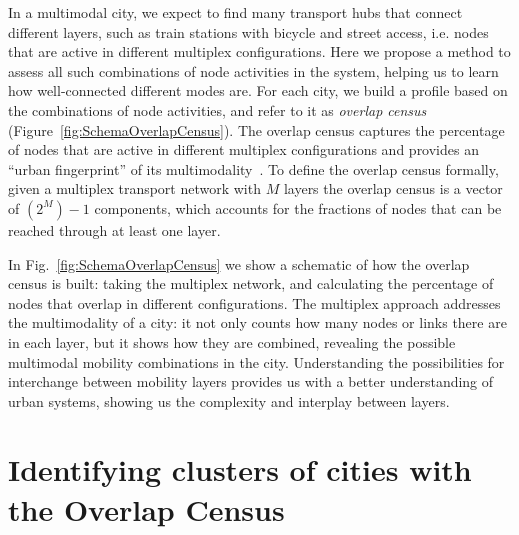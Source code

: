 In a multimodal city, we expect to find many transport hubs that connect different layers, such as train stations with bicycle and street access, i.e. nodes that are active in different multiplex configurations. Here we propose a method to assess all such combinations of node activities in the system, helping us to learn how well-connected different modes are. For each city, we build a profile based on the combinations of node activities, and refer to it as \emph{overlap census} (Figure~\ref{fig:SchemaOverlapCensus}). The overlap census captures the percentage of nodes that are active in different multiplex configurations and provides an ``urban fingerprint'' of its multimodality~\cite{Aleta2017Multilayer}. To define the overlap census formally, given a multiplex transport network with $M$ layers the overlap census is a vector of $(2^M)-1$ components, which accounts for the fractions of nodes that can be reached through at least one layer.

In Fig.~\ref{fig:SchemaOverlapCensus} we show a schematic of how the overlap census is built: taking the multiplex network, and calculating the percentage of nodes that overlap in different configurations. The multiplex approach addresses the multimodality of a city: it not only counts how many nodes or links there are in each layer, but it shows how they are combined, revealing the possible multimodal mobility combinations in the city. Understanding the possibilities for interchange between mobility layers provides us with a better understanding of urban systems, showing us the complexity and interplay between layers.


\section{Identifying clusters of cities with the Overlap Census}

